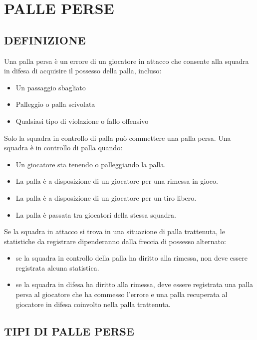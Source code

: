 \section{PALLE PERSE}
\sectionline

\subsection{DEFINIZIONE}
\subsectionline

Una palla persa è un errore di un giocatore in attacco che consente alla squadra in difesa di acquisire il possesso della palla, incluso:

\begin{itemize}
    \item Un passaggio sbagliato
    \item Palleggio o palla scivolata
    \item Qualsiasi tipo di violazione o fallo offensivo
\end{itemize}

Solo la squadra in controllo di palla può commettere una palla persa. Una squadra è in controllo di palla quando:

\begin{itemize}
    \item Un giocatore sta tenendo o palleggiando la palla.
    \item La palla è a disposizione di un giocatore per una rimessa in gioco.
    \item La palla è a disposizione di un giocatore per un tiro libero.
    \item La palla è passata tra giocatori della stessa squadra.
\end{itemize}

Se la squadra in attacco si trova in una situazione di palla trattenuta, le statistiche da registrare dipenderanno dalla freccia di possesso alternato:

\begin{itemize}
    \item se la squadra in controllo della palla ha diritto alla rimessa, non deve essere registrata alcuna statistica.
    \item se la squadra in difesa ha diritto alla rimessa, deve essere registrata una palla persa al giocatore che ha commesso l'errore e una palla recuperata al giocatore in difesa coinvolto nella palla trattenuta.
\end{itemize}

\subsection{TIPI DI PALLE PERSE}
\subsectionline

